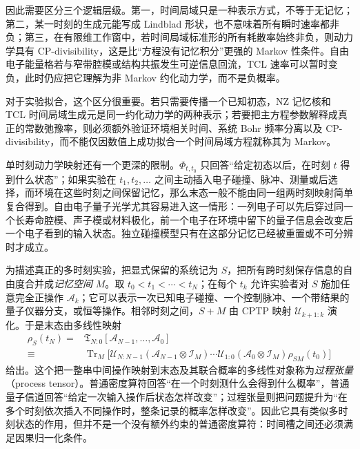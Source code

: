 因此需要区分三个逻辑层级。第一，时间局域只是一种表示方式，不等于无记忆；第二，某一时刻的生成元能写成 Lindblad 形状，也不意味着所有瞬时速率都非负；第三，在有限维工作窗中，若时间局域标准形的所有耗散率始终非负，则动力学具有 CP-divisibility，这是比“方程没有记忆积分”更强的 Markov 性条件。自由电子能量格若与窄带腔模或结构共振发生可逆信息回流，TCL 速率可以暂时变负，此时仍应把它理解为非 Markov 约化动力学，而不是负概率。

对于实验拟合，这个区分很重要。若只需要传播一个已知初态，NZ 记忆核和 TCL 时间局域生成元是同一约化动力学的两种表示；若要把主方程参数解释成真正的常数弛豫率，则必须额外验证环境相关时间、系统 Bohr 频率分离以及 CP-divisibility，而不能仅因数值上成功拟合一个时间局域方程就称其为 Markov。



单时刻动力学映射还有一个更深的限制。$\Phi_{t,t_0}$ 只回答“给定初态以后，在时刻 $t$ 得到什么状态”；如果实验在 $t_1,t_2,\ldots$ 之间主动插入电子碰撞、脉冲、测量或后选择，而环境在这些时刻之间保留记忆，那么末态一般不能由同一组两时刻映射简单复合得到。自由电子量子光学尤其容易进入这一情形：一列电子可以先后穿过同一个长寿命腔模、声子模或材料极化，前一个电子在环境中留下的量子信息会改变后一个电子看到的输入状态。独立碰撞模型只有在这部分记忆已经被重置或不可分辨时才成立\cite{Ciccarello2022CollisionModels,Pollock2018OperationalMarkov,Keeling2026ProcessTensor}。

为描述真正的多时刻实验，把显式保留的系统记为 $S$，把所有跨时刻保存信息的自由度合并成\emph{记忆空间} $M$。取 $t_0<t_1<\cdots<t_N$；在每个 $t_k$ 允许实验者对 $S$ 施加任意完全正操作 $\mathcal A_k$；它可以表示一次已知电子碰撞、一个控制脉冲、一个带结果的量子仪器分支，或恒等操作。相邻时刻之间，$S+M$ 由 CPTP 映射 $\mathcal U_{k+1:k}$ 演化。于是末态由多线性映射
\begin{equation}
\boxed{
\begin{aligned}
\rho_S(t_N)
={}&\mathfrak T_{N:0}
[\mathcal A_{N-1},\ldots,\mathcal A_0]\\
\equiv{}&\operatorname{Tr}_M\!\Big[
\mathcal U_{N:N-1}(\mathcal A_{N-1}\otimes\mathcal I_M)
\cdots
\mathcal U_{1:0}(\mathcal A_0\otimes\mathcal I_M)
\rho_{SM}(t_0)
\Big]
\end{aligned}}
\label{eq:process_tensor_multitime_definition}
\end{equation}
给出。这个把一整串中间操作映射到末态及其联合概率的多线性对象称为\emph{过程张量}（process tensor）。普通密度算符回答“在一个时刻测什么会得到什么概率”，普通量子信道回答“给定一次输入操作后状态怎样改变”；过程张量则把问题提升为“在多个时刻依次插入不同操作时，整条记录的概率怎样改变”。因此它具有类似多时刻状态的作用，但并不是一个没有额外约束的普通密度算符：时间槽之间还必须满足因果归一化条件。

